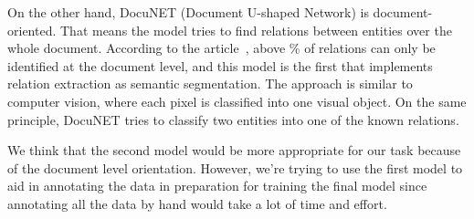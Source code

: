 \documentclass[fleqn,moreauthors,10pt]{ds_report}
\begin{document}
On the other hand, DocuNET (Document U-shaped Network) is document-oriented. That means the model tries to find relations between entities over the whole document. According to the article~\cite{ijcai2021-551}, above \% of relations can only be identified at the document level, and this model is the first that implements relation extraction as semantic segmentation. The approach is similar to computer vision, where each pixel is classified into one visual object. On the same principle, DocuNET tries to classify two entities into one of the known relations.

We think that the second model would be more appropriate for our task because of the document level orientation. However, we're trying to use the first model to aid in annotating the data in preparation for training the final model since annotating all the data by hand would take a lot of time and effort.










\end{document}
